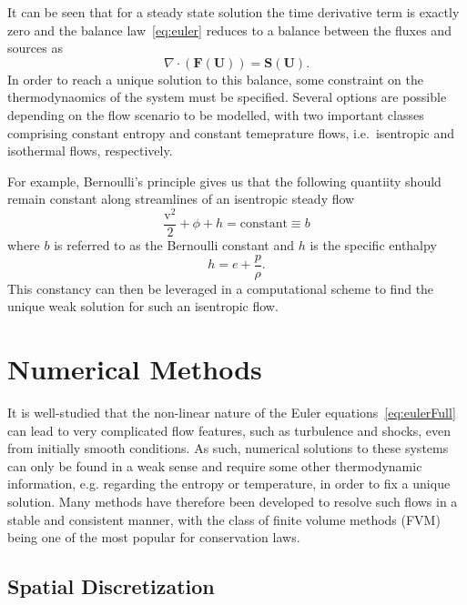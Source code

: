 It can be seen that for a steady state solution the time derivative term is exactly zero and the balance law~\eqref{eq:euler} reduces to a balance between the fluxes and sources as
\begin{equation} \label{eq:balance}
\nabla\cdot(\mathbf{F}(\mathbf{U}))=\mathbf{S}(\mathbf{U}).
\end{equation}
In order to reach a unique solution to this balance, some constraint on the thermodynaomics of the system must be specified. Several options are possible depending on the flow scenario to be modelled, with two important classes comprising constant entropy and constant temeprature flows, i.e.~isentropic and isothermal flows, respectively.

For example, Bernoulli's principle gives us that the following quantiity should remain constant along streamlines of an isentropic steady flow
\begin{equation}
\frac{\mathrm{v}^2}{2}+\phi+h=\textrm{constant}\equiv b
\end{equation}
where $b$ is referred to as the Bernoulli constant and $h$ is the specific enthalpy
\begin{equation}
h=e+\frac{p}{\rho}.
\end{equation}
This constancy can then be leveraged in a computational scheme to find the unique weak solution for such an isentropic flow.


\section{Numerical Methods}
\label{sec:numerics}

It is well-studied that the non-linear nature of the Euler equations~\eqref{eq:eulerFull} can lead to very complicated flow features, such as turbulence and shocks, even from initially smooth conditions. As such, numerical solutions to these systems can only be found in a weak sense and require some other thermodynamic information, e.g. regarding the entropy or temperature, in order to fix a unique solution. Many methods have therefore been developed to resolve such flows in a stable and consistent manner, with the class of finite volume methods (FVM) being one of the most popular for conservation laws.

\subsection{Spatial Discretization}
\label{subsec:space}

